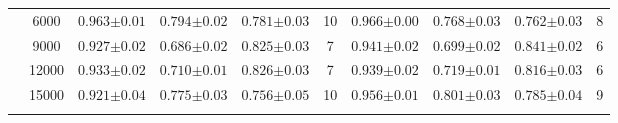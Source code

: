 \begin{table}[hbtp]
\begin{tabularx}{\textwidth}{cc | YYYc | YYYc }
        & 6000 & $0.963{\scriptscriptstyle\pm0.01}$ & $0.794{\scriptscriptstyle\pm0.02}$ & $0.781{\scriptscriptstyle\pm0.03}$ & 10 & $0.966{\scriptscriptstyle\pm0.00}$ & $0.768{\scriptscriptstyle\pm0.03}$ & $0.762{\scriptscriptstyle\pm0.03}$ & 8\\
        & 9000 & $0.927{\scriptscriptstyle\pm0.02}$ & $0.686{\scriptscriptstyle\pm0.02}$ & $0.825{\scriptscriptstyle\pm0.03}$ & 7 & $0.941{\scriptscriptstyle\pm0.02}$ & $0.699{\scriptscriptstyle\pm0.02}$ & $0.841{\scriptscriptstyle\pm0.02}$ & 6\\
        & 12000 & $0.933{\scriptscriptstyle\pm0.02}$ & $0.710{\scriptscriptstyle\pm0.01}$ & $0.826{\scriptscriptstyle\pm0.03}$ & 7 & $0.939{\scriptscriptstyle\pm0.02}$ & $0.719{\scriptscriptstyle\pm0.01}$ & $0.816{\scriptscriptstyle\pm0.03}$ & 6\\
        & 15000 & $0.921{\scriptscriptstyle\pm0.04}$ & $0.775{\scriptscriptstyle\pm0.03}$ & $0.756{\scriptscriptstyle\pm0.05}$ & 10 & $0.956{\scriptscriptstyle\pm0.01}$ & $0.801{\scriptscriptstyle\pm0.03}$ & $0.785{\scriptscriptstyle\pm0.04}$ & 9\\

    \end{tabularx}
\end{table}